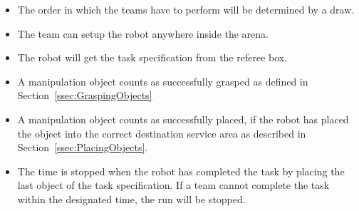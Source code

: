  \begin{itemize}
 \item The order in which the teams have to perform will be determined by a draw.
 \item The team can setup the robot anywhere inside the arena.
 \item The robot will get the task specification from the referee box.
 \item A manipulation object counts as successfully grasped as defined in Section~\ref{ssec:GraspingObjects}
 \item A manipulation object counts as successfully placed, if the robot has placed the object into the correct destination service area as described in Section~\ref{ssec:PlacingObjects}.
 \item The time is stopped when the robot has completed the task by placing the last object of the task specification. If a team cannot complete the task within the designated time, the run will be stopped.
 \end{itemize}

%
%
%
